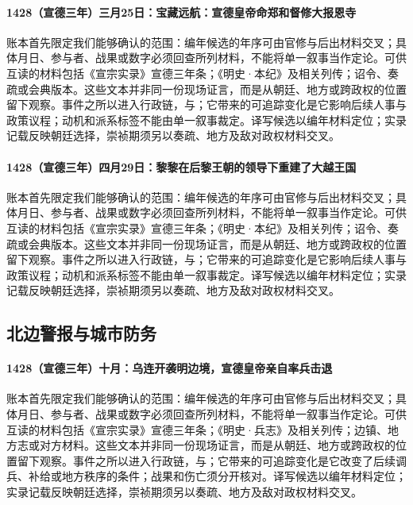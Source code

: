 \paragraph{1428（宣德三年）三月25日：宝藏远航：宣德皇帝命郑和督修大报恩寺} 账本首先限定我们能够确认的范围：编年候选的年序可由官修与后出材料交叉；具体月日、参与者、战果或数字必须回查所列材料，不能将单一叙事当作定论。可供互读的材料包括《宣宗实录》宣德三年条；《明史·本纪》及相关列传；诏令、奏疏或会典版本。这些文本并非同一份现场证言，而是从朝廷、地方或跨政权的位置留下观察。事件之所以进入行政链，与；它带来的可追踪变化是它影响后续人事与政策议程；动机和派系标签不能由单一叙事裁定。译写候选以编年材料定位；实录记载反映朝廷选择，崇祯期须另以奏疏、地方及敌对政权材料交叉。

\paragraph{1428（宣德三年）四月29日：黎黎在后黎王朝的领导下重建了大越王国} 账本首先限定我们能够确认的范围：编年候选的年序可由官修与后出材料交叉；具体月日、参与者、战果或数字必须回查所列材料，不能将单一叙事当作定论。可供互读的材料包括《宣宗实录》宣德三年条；《明史·本纪》及相关列传；诏令、奏疏或会典版本。这些文本并非同一份现场证言，而是从朝廷、地方或跨政权的位置留下观察。事件之所以进入行政链，与；它带来的可追踪变化是它影响后续人事与政策议程；动机和派系标签不能由单一叙事裁定。译写候选以编年材料定位；实录记载反映朝廷选择，崇祯期须另以奏疏、地方及敌对政权材料交叉。

\subsection{北边警报与城市防务}

\paragraph{1428（宣德三年）十月：乌连开袭明边境，宣德皇帝亲自率兵击退} 账本首先限定我们能够确认的范围：编年候选的年序可由官修与后出材料交叉；具体月日、参与者、战果或数字必须回查所列材料，不能将单一叙事当作定论。可供互读的材料包括《宣宗实录》宣德三年条；《明史·兵志》及相关列传；边镇、地方志或对方材料。这些文本并非同一份现场证言，而是从朝廷、地方或跨政权的位置留下观察。事件之所以进入行政链，与；它带来的可追踪变化是它改变了后续调兵、补给或地方秩序的条件；战果和伤亡须分开核对。译写候选以编年材料定位；实录记载反映朝廷选择，崇祯期须另以奏疏、地方及敌对政权材料交叉。

